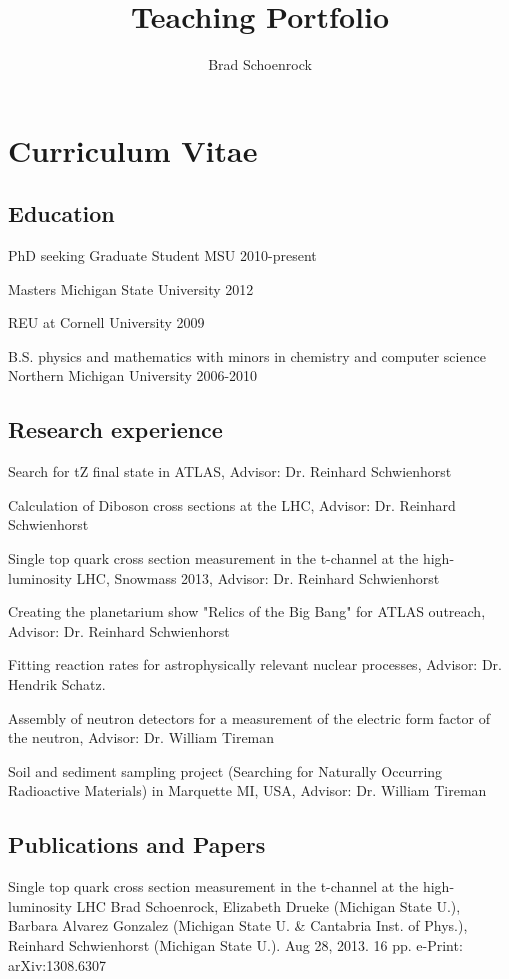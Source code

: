 \documentclass{article}
\title{Teaching Portfolio}
\author{Brad Schoenrock}
\date{}
\begin{document}
\maketitle
\Large

\tableofcontents

\newpage

\section{Curriculum Vitae}

\subsection{Education}
\hspace{0.5cm}PhD seeking Graduate Student MSU 2010-present

Masters Michigan State University 2012

REU at Cornell University 2009

B.S. physics and mathematics with minors in chemistry and computer science Northern Michigan University 2006-2010


\subsection{Research experience}
\hspace{0.5cm}Search for tZ final state in ATLAS, Advisor: Dr. Reinhard Schwienhorst

Calculation of Diboson cross sections at the LHC, Advisor: Dr. Reinhard Schwienhorst

Single top quark cross section measurement in the t-channel at the high-luminosity LHC, Snowmass 2013,  Advisor: Dr. Reinhard Schwienhorst

Creating the planetarium show "Relics of the Big Bang" for ATLAS outreach, Advisor: Dr. Reinhard Schwienhorst

Fitting reaction rates for astrophysically relevant nuclear processes, Advisor: Dr. Hendrik Schatz. 

Assembly of neutron detectors for a measurement of the electric form factor of the neutron, Advisor: Dr. William Tireman

Soil and sediment sampling project (Searching for Naturally Occurring Radioactive Materials) in Marquette MI, USA, Advisor: Dr. William Tireman


\subsection{Publications and Papers}
\hspace{0.5cm}Single top quark cross section measurement in the t-channel at the high-luminosity LHC
Brad Schoenrock, Elizabeth Drueke (Michigan State U.), Barbara Alvarez Gonzalez (Michigan State U. \& Cantabria Inst. of Phys.), Reinhard Schwienhorst (Michigan State U.). Aug 28, 2013. 16 pp.
e-Print: arXiv:1308.6307
\end{document}
